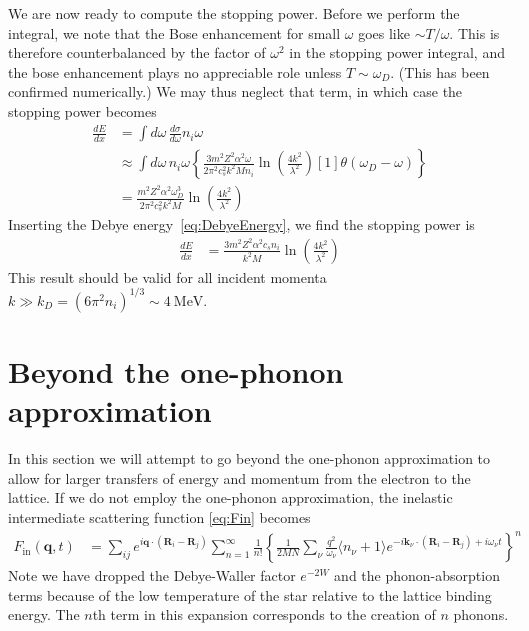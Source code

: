 \documentclass{article}
\newcommand{\MeV}{\text{MeV}}
\begin{document}
We are now ready to compute the stopping power. Before we perform the integral, we note that the Bose enhancement for small $\omega$ goes like $ \sim T / \omega$. This is therefore counterbalanced by the factor of $\omega^2$ in the stopping power integral, and the bose enhancement plays no appreciable role unless $T \sim \omega_D$. (This has been confirmed numerically.) We may thus neglect that term, in which case the stopping power becomes
\begin{align}
\frac{dE}{d x} &= \int d \omega \,\frac{d \sigma}{d \omega} n_i \omega \\
  &\approx \int d \omega \,n_i \omega \left\{ \frac{3 m^2 Z^2 \alpha^2 \omega}{2\pi^2 c_s^2 k^2 M n_i} \ln \left( \frac{4 k^2}{\lambda^2} \right) \left[ 1 \right] \theta(\omega_D - \omega) \right\} \\
   &= \frac{m^2 Z^2 \alpha^2 \omega_D^3}{2 \pi^2 c_s^2 k^2 M} \ln\left( \frac{4 k^2}{\lambda^2} \right)
\end{align}
Inserting the Debye energy~\eqref{eq:DebyeEnergy}, we find the stopping power is
\begin{align}
\frac{d E}{d x} &= \frac{3 m^2 Z^2 \alpha^2 c_s n_i}{k^2 M} \ln\left( \frac{4 k^2}{\lambda^2} \right)
\end{align}
This result should be valid for all incident momenta $k\gg k_D = (6 \pi^2 n_i)^{1/3} \sim 4~\MeV$. 

\section{Beyond the one-phonon approximation}

In this section we will attempt to go beyond the one-phonon approximation to allow for larger transfers of energy and momentum from the electron to the lattice. If we do not employ the one-phonon approximation, the inelastic intermediate scattering function \eqref{eq:Fin} becomes
\begin{align}
  F_\text{in}(\textbf{q}, t) &= \sum_{ij} e^{i\textbf{q}\cdot(\textbf{R}_i - \textbf{R}_j)} \sum_{n = 1}^\infty \frac{1}{n!}\left\{ \frac{1}{2 MN} \sum_\nu \frac{q^2}{\omega_\nu} \langle n_\nu + 1 \rangle e^{-i \textbf{k}_\nu \cdot(\textbf{R}_i - \textbf{R}_j) + i \omega_\nu t} \right\}^n
\end{align}
Note we have dropped the Debye-Waller factor $e^{-2 W}$ and the phonon-absorption terms because of the low temperature of the star relative to the lattice binding energy. The $n$th term in this expansion corresponds to the creation of $n$ phonons.
\end{document}
